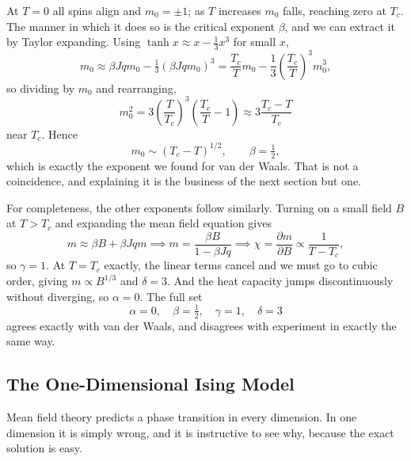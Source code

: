 \documentclass[a4paper]{scrartcl}
\begin{document}
\begin{center}
\end{center}

At $T = 0$ all spins align and $m_0 = \pm 1$; as $T$ increases $m_0$ falls, reaching zero at $T_c$. The manner in which it does so is the critical exponent $\beta$, and we can extract it by Taylor expanding. Using $\tanh x \approx x - \tfrac13 x^3$ for small $x$,
$$
m_0 \approx \beta Jqm_0 - \tfrac 13 (\beta Jq m_0)^3 = \frac{T_c}{T}m_0 - \frac 13\left(\frac{T_c}{T}\right)^3 m_0^3,
$$
so dividing by $m_0$ and rearranging,
$$
m_0^2 = 3\left(\frac{T}{T_c}\right)^3\left(\frac{T_c}{T}-1\right) \approx 3\frac{T_c - T}{T_c}
$$
near $T_c$. Hence
$$
m_0 \sim (T_c - T)^{1/2}, \qquad \beta = \tfrac 12,
$$
which is exactly the exponent we found for van der Waals. That is not a coincidence, and explaining it is the business of the next section but one.

For completeness, the other exponents follow similarly. Turning on a small field $B$ at $T > T_c$ and expanding the mean field equation gives
$$
m \approx \beta B + \beta Jqm \implies m = \frac{\beta B}{1 - \beta Jq} \implies \chi = \frac{\partial m}{\partial B} \propto \frac{1}{T - T_c},
$$
so $\gamma = 1$. At $T = T_c$ exactly, the linear terms cancel and we must go to cubic order, giving $m \propto B^{1/3}$ and $\delta = 3$. And the heat capacity jumps discontinuously without diverging, so $\alpha = 0$. The full set
$$
\alpha = 0, \quad\beta = \tfrac12,\quad \gamma = 1,\quad \delta = 3
$$
agrees exactly with van der Waals, and disagrees with experiment in exactly the same way.

\subsection{The One-Dimensional Ising Model}\label{sec:1dising}

Mean field theory predicts a phase transition in every dimension. In one dimension it is simply wrong, and it is instructive to see why, because the exact solution is easy.
\end{document}
